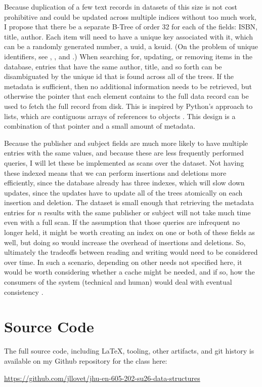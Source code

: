 \documentclass[10pt,letterpaper,final]{report}
\begin{document}
Because duplication of a few text records in datasets of this size is not cost prohibitive and could be updated across multiple indices without too much work, I propose that there be a separate B-Tree of order 32 for each of the fields: ISBN, title, author. Each item will need to have a unique key associated with it, which can be a randomly generated number, a uuid, a ksuid. (On the problem of unique identifiers, see \parencite{JonathanLlovet2025WhatsInAName}, \parencite{TwilioBriefHistoryOfTheUUID}, and \parencite{GitHubGitHubSegmentioksuid}.) When searching for, updating, or removing items in the database, entries that have the same author, title, and so forth can be disambiguated by the unique id that is found across all of the trees. If the metadata is sufficient, then no additional information needs to be retrieved, but otherwise the pointer that each element contains to the full data record can be used to fetch the full record from disk. This is inspired by Python's approach to lists, which are contiguous arrays of references to objects \parencite{PythonDocumentationDesignAndHistoryHowAreListsImplemented}. This design is a combination of that pointer and a small amount of metadata.

Because the publisher and subject fields are much more likely to have multiple entries with the same values, and because these are less frequently performed queries, I will let these be implemented as scans over the dataset. Not having these indexed means that we can perform insertions and deletions more efficiently, since the database already has three indexes, which will slow down updates, since the updates have to update all of the trees atomically on each insertion and deletion. The dataset is small enough that retrieving the metadata entries for $n$ results with the same publisher or subject will not take much time even with a full scan. If the assumption that those queries are infrequent no longer held, it might be worth creating an index on one or both of these fields as well, but doing so would increase the overhead of insertions and deletions. So, ultimately the tradeoffs between reading and writing would need to be considered over time. In such a scenario, depending on other needs not specified here, it would be worth considering whether a cache might be needed, and if so, how the consumers of the system (technical and human) would deal with eventual consistency \parencite{EricBrewer2000TowardsRobustDistributedSystems}.


\pagebreak

\section*{Source Code}
The full source code, including LaTeX, tooling, other artifacts, and git history is available on my Github repository for the class here:
\begin{center}
  \url{https://github.com/jllovet/jhu-en-605-202-su26-data-structures}
\end{center}

\printbibliography
\end{document}
